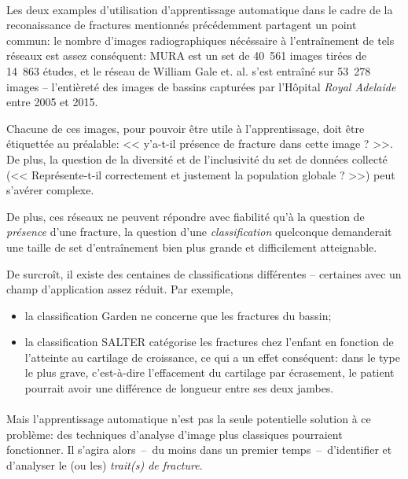 \documentclass[a4paper]{article}
\begin{document}
\paragraph{}

Les deux examples d'utilisation d'apprentissage automatique dans le cadre de la reconaissance de fractures mentionnés
précédemment partagent un point commun: le nombre d'images radiographiques nécéssaire à l'entraînement de tels réseaux
est assez conséquent: MURA\cite{mura-paper} est un set de 40~561 images tirées de 14~863 études, et le réseau de William
Gale et. al. s'est entraîné sur 53~278 images -- l'entièreté des images de bassins capturées par l'Hôpital \emph{Royal
Adelaide} entre 2005 et 2015\cite{detect-hip}.


Chacune de ces images, pour pouvoir être utile à l'apprentissage, doit être étiquettée au préalable: << y'a-t-il
présence de fracture dans cette image ? >>. De plus, la question de la diversité et de l'inclusivité du set de données
collecté (<< Représente-t-il correctement et justement la population globale ? >>) peut s'avérer
complexe\cite{dataset-bias}.

De plus, ces réseaux ne peuvent répondre avec fiabilité qu'à la question de \emph{présence} d'une fracture, la question
d'une \emph{classification} quelconque demanderait  une taille de set d'entraînement bien plus grande et
difficilement atteignable.

De surcroît, il existe des centaines de classifications différentes -- certaines avec un champ d'application assez
réduit.  Par exemple, 

\begin{itemize}
    \item la classification Garden\cite{garden-paper} ne concerne que les fractures du bassin; 
    \item la classification SALTER\cite{salter} catégorise les fractures chez l'enfant en fonction de l'atteinte au 
        cartilage de croissance, ce qui a un effet conséquent: dans le type le plus grave, c'est-à-dire 
        l'effacement du cartilage par écrasement, le patient pourrait avoir une différence de longueur 
        entre ses deux jambes.
\end{itemize}

\paragraph{}

Mais l'apprentissage automatique n'est pas la seule potentielle solution à ce problème: des techniques d'analyse d'image
plus classiques pourraient fonctionner.  Il s'agira alors~--~du moins dans un premier temps~--~d'identifier et
d'analyser le (ou les) \emph{trait(s) de fracture}.
\end{document}
